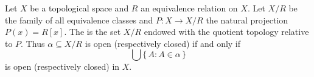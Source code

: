 Let $X$ be a topological space and $R$ an equivalence relation on $X$. Let $X/R$ be the family of all equivalence classes and $P: X \to X/R$ the natural projection $P(x) = R[x]$. The  is the set $X/R$ endowed with the quotient topology relative to $P$. Thus $\alpha \subseteq X/R$ is open (respectively closed) if and only if
$$\bigcup \{\, A : A \in \alpha \,\}$$
is open (respectively closed) in $X$.
